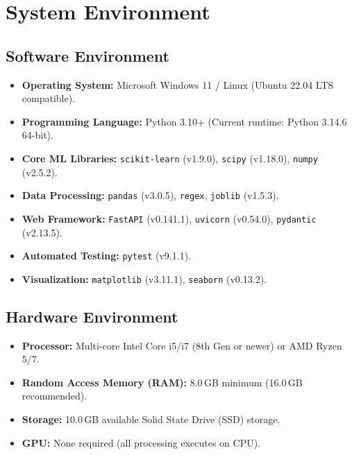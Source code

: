 \section{System Environment}
\label{sec:system_environment}

\subsection{Software Environment}
\begin{itemize}
    \item \textbf{Operating System:} Microsoft Windows 11 / Linux (Ubuntu 22.04 LTS compatible).
    \item \textbf{Programming Language:} Python 3.10+ (Current runtime: Python 3.14.6 64-bit).
    \item \textbf{Core ML Libraries:} \texttt{scikit-learn} (v1.9.0), \texttt{scipy} (v1.18.0), \texttt{numpy} (v2.5.2).
    \item \textbf{Data Processing:} \texttt{pandas} (v3.0.5), \texttt{regex}, \texttt{joblib} (v1.5.3).
    \item \textbf{Web Framework:} \texttt{FastAPI} (v0.141.1), \texttt{uvicorn} (v0.54.0), \texttt{pydantic} (v2.13.5).
    \item \textbf{Automated Testing:} \texttt{pytest} (v9.1.1).
    \item \textbf{Visualization:} \texttt{matplotlib} (v3.11.1), \texttt{seaborn} (v0.13.2).
\end{itemize}

\subsection{Hardware Environment}
\begin{itemize}
    \item \textbf{Processor:} Multi-core Intel Core i5/i7 (8th Gen or newer) or AMD Ryzen 5/7.
    \item \textbf{Random Access Memory (RAM):} 8.0\,GB minimum (16.0\,GB recommended).
    \item \textbf{Storage:} 10.0\,GB available Solid State Drive (SSD) storage.
    \item \textbf{GPU:} None required (all processing executes on CPU).
\end{itemize}
